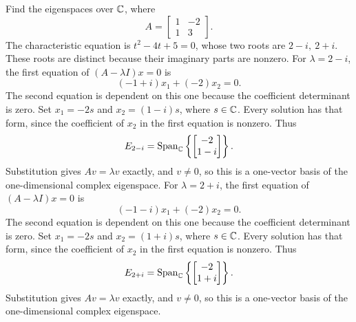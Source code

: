 \goal Find the eigenspaces over $\mathbb{C}$, where
\[A=\begin{bmatrix}1&-2\\1&3\end{bmatrix}.\]
The characteristic equation is $t^{2} - 4 t + 5=0$, whose two roots are $2 - i,\ 2 + i$. These roots are distinct because their imaginary parts are nonzero.
For $\lambda=2 - i$, the first equation of $(A-\lambda I)x=0$ is
\[(-1 + i)x_1+(-2)x_2=0.\]
The second equation is dependent on this one because the coefficient determinant is zero. Set $x_1=-2s$ and $x_2=(1 - i)s$, where $s\in\mathbb{C}$. Every solution has that form, since the coefficient of $x_2$ in the first equation is nonzero. Thus
\[E_{2 - i}=\operatorname{Span}_{\mathbb{C}}\left\{\begin{bmatrix}-2\\1 - i\end{bmatrix}\right\}.\]
Substitution gives $Av=\lambda v$ exactly, and $v\ne0$, so this is a one-vector basis of the one-dimensional complex eigenspace.
For $\lambda=2 + i$, the first equation of $(A-\lambda I)x=0$ is
\[(-1 - i)x_1+(-2)x_2=0.\]
The second equation is dependent on this one because the coefficient determinant is zero. Set $x_1=-2s$ and $x_2=(1 + i)s$, where $s\in\mathbb{C}$. Every solution has that form, since the coefficient of $x_2$ in the first equation is nonzero. Thus
\[E_{2 + i}=\operatorname{Span}_{\mathbb{C}}\left\{\begin{bmatrix}-2\\1 + i\end{bmatrix}\right\}.\]
Substitution gives $Av=\lambda v$ exactly, and $v\ne0$, so this is a one-vector basis of the one-dimensional complex eigenspace.


